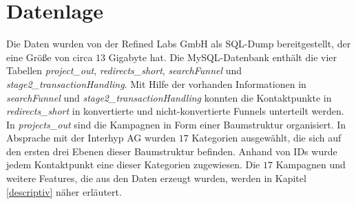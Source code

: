 \section{Datenlage}\label{datenlage}
Die Daten wurden von der Refined Labs GmbH als SQL-Dump bereitgestellt, der eine Größe von circa $13$ Gigabyte hat. Die MySQL-Datenbank enthält die vier Tabellen \textit{project\_out}, \textit{redirects\_short}, \textit{searchFunnel} und \textit{stage2\_transactionHandling}. Mit Hilfe der vorhanden Informationen in \textit{searchFunnel} und \textit{stage2\_transactionHandling} konnten die Kontaktpunkte in \textit{redirects\_short} in konvertierte und nicht-konvertierte Funnels unterteilt werden. In \textit{projects\_out} sind die Kampagnen in Form einer Baumstruktur organisiert. In Absprache mit der Interhyp AG wurden $17$ Kategorien ausgewählt, die sich auf den ersten drei Ebenen dieser Baumstruktur befinden. Anhand von IDs wurde jedem Kontaktpunkt eine dieser Kategorien zugewiesen. Die $17$ Kampagnen und weitere Features, die aus den Daten erzeugt wurden, werden in Kapitel \ref{descriptiv} näher erläutert.\\
